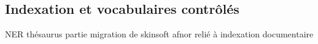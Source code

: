 \subsection{Indexation et vocabulaires contrôlés}

NER 
thésaurus partie migration de skinsoft 
afnor 
relié à indexation documentaire 